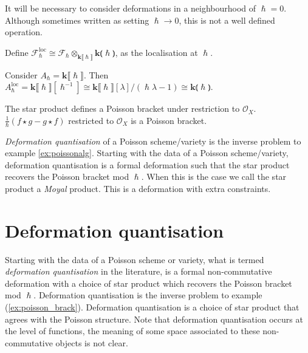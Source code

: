  
    It will be necessary to consider deformations in a neighbourhood of \(\hslash= 0\). Although sometimes written as setting \(\hslash\rightarrow 0\), this is not a well defined operation.
    
    \begin{defn}[Localisation] Define \( \mathcal{F}_{\hslash}^{\mathrm{loc}} \cong \mathcal{F}_{\hslash} \otimes_{\mathbf{k}\lBrack \hslash \rBrack} \mathbf{k} \lParen \hslash \rParen\), as the localisation at \( \hslash\).
    \end{defn}
    
    \begin{ex}Consider \( A_{\hslash} = \mathbf{k} \lBrack \hslash \rBrack\). Then
    \(A^{\mathrm{loc}}_{\hslash} = \mathbf{k}\lBrack \hslash \rBrack [  \hslash^{-1} ] \cong \mathbf{k} \lBrack \hslash \rBrack  [\lambda ] / ( \hslash \lambda - 1) \cong \mathbf{k} \lParen \hslash \rParen \).
    \end{ex}    
    
    \begin{ex}
    \label{ex:poisson_brack}
    The star product defines a Poisson bracket under restriction to \( \mathcal{O}_X\).
    \( \frac{1}{\hslash} \left( f \star g - g \star f\right) \) restricted to \( \mathcal{O}_X\) is a Poisson bracket.
    \end{ex} 

    
    
    \emph{Deformation quantisation} of a Poisson scheme/variety is the inverse problem to example \ref{ex:poissonalg}. Starting with the data of a Poisson scheme/variety, deformation quantisation is a formal deformation such that the star product recovers the Poisson bracket mod \( \hslash\). When this is the case we call the star product a \emph{Moyal} product. This is a deformation with extra constraints.
    
    \section{Deformation quantisation}
   
    
    Starting with the data of a Poisson scheme or variety, what is termed \emph{deformation quantisation} in the literature, is a formal non-commutative deformation with a choice of star product which recovers the Poisson bracket mod \( \hslash\).  Deformation quantisation is the inverse problem to example (\ref{ex:poisson_brack}). Deformation quantisation is a choice of star product that agrees with the Poisson structure. Note that deformation quantisation occurs at the level of functions, the meaning of some space associated to these non-commutative objects is not clear.
    
